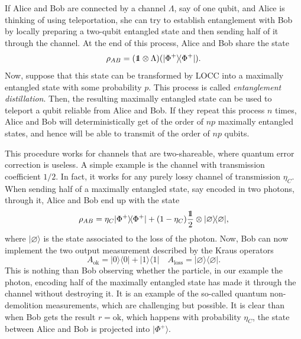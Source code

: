 \documentclass[a4paper]{article}
\def\one{\leavevmode\hbox{\small1\normalsize\kern-.33em1}}
\def\bra#1{\langle#1|} \def\ket#1{|#1\rangle}
\def\proj#1{\ket{#1}\!\bra{#1}}
\begin{document}
If Alice and Bob are connected by a channel $\Lambda$, say of one qubit, and Alice is thinking of using teleportation, she can try to establish entanglement with Bob by locally preparing a two-qubit entangled state and then sending half of it through the channel. At the end of this process, Alice and Bob share the state
\begin{equation}
\rho_{AB}=(\one\otimes\Lambda)(\proj{\Phi^+}) .
\end{equation}
Now, suppose that this state can be transformed by LOCC into a maximally entangled state with some probability $p$. This process is called \emph{entanglement distillation}. Then, the resulting maximally entangled state can be used to teleport a qubit reliable from Alice and Bob. If they repeat this process $n$ times, Alice and Bob will deterministically get of the order of $np$ maximally entangled states, and hence will be able to transmit of the order of $np$ qubits.

This procedure works for channels that are two-shareable, where quantum error correction is useless. A simple example is the channel with transmission coefficient $1/2$. In fact, it works for any purely lossy channel of transmission $\eta_C$. When sending half of a maximally entangled state, say encoded in two photons, through it, Alice and Bob end up with the state
\begin{equation}
\rho_{AB}=\eta_C\proj{\Phi^+}+(1-\eta_C)\frac{\one}{2}\otimes\proj\varnothing ,
\end{equation}
where $\ket\varnothing$ is the state associated to the loss of the photon. Now, Bob can now implement the two output measurement described by the Kraus operators
\begin{equation}
A_{\text{ok}}=\proj 0+\proj 1\quad A_{\text{loss}}=\proj\varnothing .
\end{equation}
This is nothing than Bob observing whether the particle, in our example the photon, encoding half of the maximally entangled state has made it through the channel without destroying it. It is an example of the so-called quantum non-demolition measurements, which are challenging but possible.  It is clear than when Bob gets the result $r=\text{ok}$, which happens with probability $\eta_C$, the state between Alice and Bob is projected into $\ket{\Phi^+}$. 
 
\end{document}
